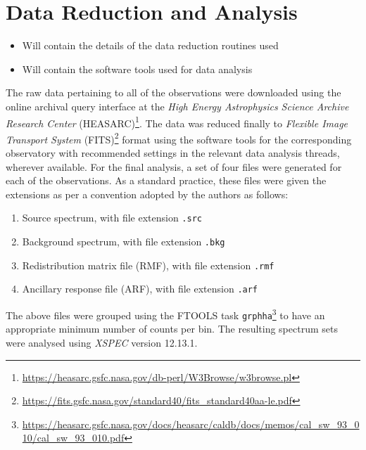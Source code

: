 \section{Data Reduction and Analysis} \label{sec:reduction-analysis}
    \begin{itemize}
        \item Will contain the details of the data reduction routines used
        \item Will contain the software tools used for data analysis
    \end{itemize}
    The raw data pertaining to all of the observations were downloaded using the online archival query interface at the \textit{High Energy Astrophysics Science Archive Research Center} (HEASARC)\footnote{\url{https://heasarc.gsfc.nasa.gov/db-perl/W3Browse/w3browse.pl}}. The data was reduced finally to \textit{Flexible Image Transport System} (FITS)\footnote{\url{https://fits.gsfc.nasa.gov/standard40/fits_standard40aa-le.pdf}} format using the software tools for the corresponding observatory with recommended settings in the relevant data analysis threads, wherever available. For the final analysis, a set of four files were generated for each of the observations. As a standard practice, these files were given the extensions as per a convention adopted by the authors as follows:
    \begin{enumerate}
    	\item Source spectrum, with file extension \texttt{.src}
    	\item Background spectrum, with file extension \texttt{.bkg}
    	\item Redistribution matrix file (RMF), with file extension \texttt{.rmf}
    	\item Ancillary response file (ARF), with file extension \texttt{.arf}
    \end{enumerate}
    The above files were grouped using the FTOOLS task \texttt{grphha}\footnote{\url{https://heasarc.gsfc.nasa.gov/docs/heasarc/caldb/docs/memos/cal_sw_93_010/cal_sw_93_010.pdf}} to have an appropriate minimum number of counts per bin. The resulting spectrum sets were analysed using \textit{XSPEC} version 12.13.1.
    
